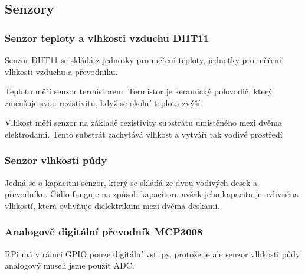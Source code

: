 \documentclass[12pt,a4paper]{article}
\begin{document}
\subsection{Senzory}

\subsubsection{Senzor teploty a vlhkosti vzduchu DHT11}

Senzor \ac{DHT11} se skládá z jednotky pro měření teploty, jednotky pro měření vlhkosti vzduchu a převodníku.

Teplotu měří senzor termistorem. Termistor je keramický polovodič, který zmenšuje svou rezistivitu, když se okolní teplota zvýší.

Vlhkost měří senzor na základě rezistivity substrátu umístěného mezi dvěma elektrodami. Tento substrát zachytává vlhkost a vytváří tak vodivé prostředí

\subsubsection{Senzor vlhkosti půdy}

Jedná se o kapacitní senzor, který se skládá ze dvou vodivých desek a převodníku. Čidlo funguje na způsob kapacitoru avšak jeho kapacita je ovlivněna vlhkostí, která ovlivňuje dielektrikum mezi dvěma deskami.

\subsubsection{Analogově digitální převodník MCP3008}

\underline{\ac{RPi}} má v rámci \underline{\ac{GPIO}} pouze digitální vstupy, protože je ale senzor vlhkosti půdy analogový museli jsme použít \ac{ADC}.


\end{document}
